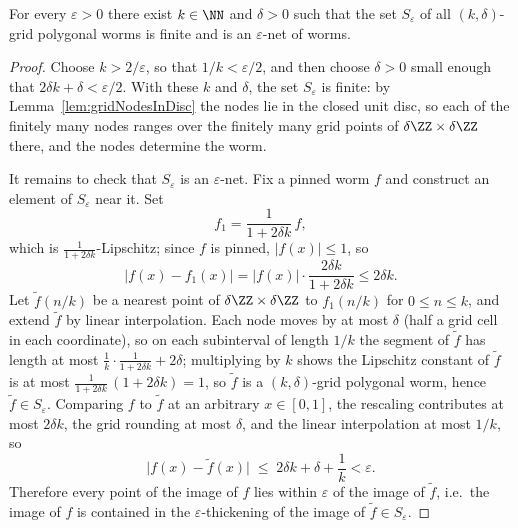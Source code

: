 \begin{theorem}
    \label{thm:finiteEpsilonNet}
    \leanok
    For every $\varepsilon > 0$ there exist $k \in \NN$ and $\delta > 0$ such
    that the set $S_\varepsilon$ of all $(k,\delta)$-grid polygonal worms is
    finite and is an $\varepsilon$-net of worms.
\end{theorem}
\begin{proof}
    Choose $k > 2/\varepsilon$, so that $1/k < \varepsilon/2$, and then choose
    $\delta > 0$ small enough that $2\delta k + \delta < \varepsilon/2$. With
    these $k$ and $\delta$, the set $S_\varepsilon$ is finite: by
    Lemma~\ref{lem:gridNodesInDisc} the nodes lie in the closed unit disc, so each of
    the finitely many nodes ranges over the finitely many grid points of
    $\delta\ZZ \times \delta\ZZ$ there, and the nodes determine the worm.

    It remains to check that $S_\varepsilon$ is an $\varepsilon$-net. Fix a
    pinned worm $f$ and construct an element of $S_\varepsilon$ near it. Set
    \[
        f_1 = \frac{1}{1 + 2\delta k}\, f ,
    \]
    which is $\tfrac{1}{1+2\delta k}$-Lipschitz; since $f$ is pinned,
    $\lvert f(x) \rvert \le 1$, so
    \[
        \lvert f(x) - f_1(x) \rvert
            = \lvert f(x) \rvert \cdot \frac{2\delta k}{1 + 2\delta k}
            \le 2\delta k .
    \]
    Let $\tilde f(n/k)$ be a nearest point of $\delta\ZZ \times \delta\ZZ$ to
    $f_1(n/k)$ for $0 \le n \le k$, and extend $\tilde f$ by linear
    interpolation. Each node moves by at most $\delta$ (half a grid cell in
    each coordinate), so on each subinterval of length $1/k$ the segment of
    $\tilde f$ has length at most
    $\tfrac{1}{k}\cdot\tfrac{1}{1+2\delta k} + 2\delta$; multiplying by $k$
    shows the Lipschitz constant of $\tilde f$ is at most
    $\tfrac{1}{1+2\delta k}\,(1 + 2\delta k) = 1$, so $\tilde f$ is a
    $(k,\delta)$-grid polygonal worm, hence $\tilde f \in S_\varepsilon$. Comparing $f$ to $\tilde f$
    at an arbitrary $x \in [0,1]$, the rescaling contributes at most
    $2\delta k$, the grid rounding at most $\delta$, and the linear
    interpolation at most $1/k$, so
    \[
        \lvert f(x) - \tilde f(x) \rvert
            \;\le\; 2\delta k + \delta + \frac{1}{k} < \varepsilon .
    \]
    Therefore every point of the image of $f$ lies within $\varepsilon$ of the
    image of $\tilde f$, i.e.\ the image of $f$ is contained in the
    $\varepsilon$-thickening of the image of $\tilde f \in S_\varepsilon$.
\end{proof}

